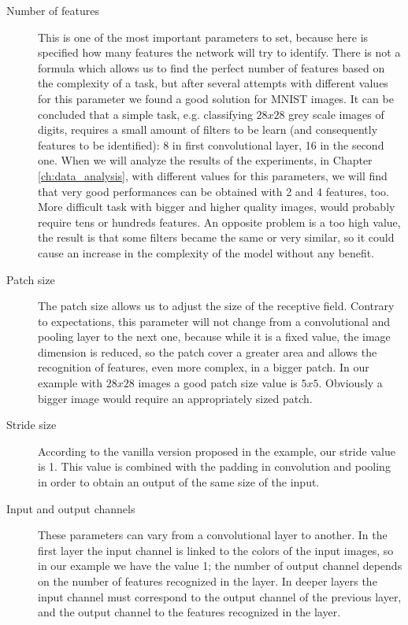 \begin{description}
	
	\item[Number of features] This is one of the most important parameters to set, because here is specified how many features the network will try to identify. There is not a formula which allows us to find the perfect number of features based on the complexity of a task, but after several attempts with different values for this parameter we found a good solution for MNIST images. It can be concluded that a simple task, e.g. classifying $28x28$ grey scale images of digits, requires a small amount of filters to be learn (and consequently features to be identified): 8 in first convolutional layer, 16 in the second one. When we will analyze the results of the experiments, in Chapter \ref{ch:data_analysis}, with different values for this parameters, we will find that very good performances can be obtained with 2 and 4 features, too. More difficult task with bigger and higher quality images, would probably require tens or hundreds features. An opposite problem is a too high value, the result is that some filters became the same or very similar, so it could cause an increase in the complexity of the model without any benefit.

	\item[Patch size] The patch size allows us to adjust the size of the receptive field. Contrary to expectations, this parameter will not change from a convolutional and pooling layer to the next one, because while it is a fixed value, the image dimension is reduced, so the patch cover a greater area and allows the recognition of features, even more complex, in a bigger patch.  In our example with $28x28$ images a good patch size value is $5x5$. Obviously a bigger image would require an appropriately sized patch.
	
	\item[Stride size] According to the vanilla version proposed in the example, our stride value is 1. This value is combined with the padding in convolution and pooling in order to obtain an output of the same size of the input.
	
	\item[Input and output channels] These parameters can vary from a convolutional layer to another. In the first layer the input channel is linked to the colors of the input images, so in our example we have the value 1; the number of output channel depends on the number of features recognized in the layer. In deeper layers the input channel must correspond to the output channel of the previous layer, and the output channel to the features recognized in the layer.
	

\end{description}
